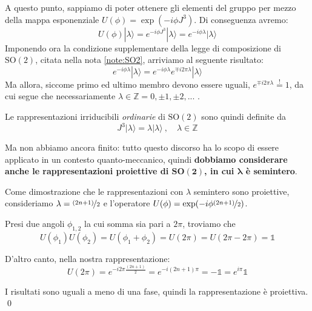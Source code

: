 \documentclass[../main.tex]{subfiles}
\begin{document}
A questo punto, sappiamo di poter ottenere gli elementi del gruppo per mezzo della mappa esponenziale \(U(\phi) = \exp(-i\phi J^3)\). Di conseguenza avremo:
\[
U(\phi)|\lambda\rangle = e^{-i\phi J^3}|\lambda\rangle = e^{-i\phi \lambda}|\lambda\rangle
\]
Imponendo ora la condizione supplementare della legge di composizione di $\text{SO}(2)$, citata nella nota \ref{note:SO2}, arriviamo al seguente risultato:
\[
 e^{-i\phi \lambda}|\lambda\rangle = e^{-i\phi \lambda}e^{\mp i2\pi\lambda}|\lambda\rangle 
\]
Ma allora, siccome primo ed ultimo membro devono essere uguali, \(e^{\mp i2\pi\lambda} \overset{!}{=}1\), da cui segue che necessariamente $\lambda\in \mathbb Z = 0, \pm1, \pm2,...$ .

Le rappresentazioni irriducibili \textit{ordinarie} di $\text{SO}(2)$ sono quindi definite da 
\[
\boxed{J^3|\lambda\rangle = \lambda|\lambda\rangle~,\quad\lambda\in\mathbb Z}
\]

Ma non abbiamo ancora finito: tutto questo discorso ha lo scopo di essere applicato in un contesto quanto-meccanico, quindi \textbf{dobbiamo considerare anche le rappresentazioni proiettive di $\textbf{SO}\mathbf{(2)}$, in cui $\mathbf{\lambda}$ è semintero}.

\begin{nota}
    Come dimostrazione che le rappresentazioni con ${\lambda}$ semintero sono proiettive, consideriamo \(\lambda = \nicefrac{(2n+1)}{2}\) e l'operatore \(U(\phi) = \exp(-i\phi\nicefrac{(2n+1)}{2})\). 
    
    Presi due angoli $\phi_{1,2}$ la cui somma sia pari a $2\pi$, troviamo che
    \[
    U(\phi_1)U(\phi_2)=U(\phi_1+\phi_2) = U(2\pi) = U(2\pi-2\pi) = \mathbb 1
    \]

    D'altro canto, nella nostra rappresentazione:
    \[
    U(2\pi) = e^{-i2\pi\frac{(2n+1)}{2}} = e^{-i(2n+1)\pi}= -\mathbb 1 = e^{i\pi}\mathbb 1
    \] 

    I risultati sono uguali a meno di una fase, quindi la rappresentazione è proiettiva. \qed
    \label{note:halfint_SO2_irreps}
\end{nota}
\end{document}
